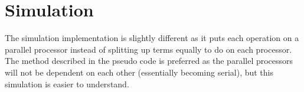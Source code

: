 \section{Simulation}
The simulation implementation is slightly different as it puts each operation on a parallel processor instead of splitting up terms equally to do on each processor. The method described in the pseudo code is preferred as the parallel processors will not be dependent on each other (essentially becoming serial), but this simulation is easier to understand.

